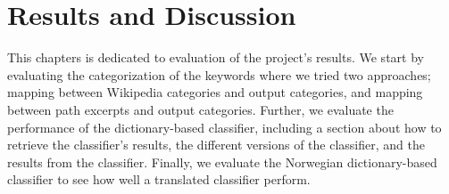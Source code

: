 \chapter{Results and Discussion}
This chapters is dedicated to evaluation of the project's results. We start by evaluating the categorization of the keywords where we tried two approaches; mapping between Wikipedia categories and output categories, and mapping between path excerpts and output categories. Further, we evaluate the performance of the dictionary-based classifier, including a section about how to retrieve the classifier's results, the different versions of the classifier, and the results from the classifier. Finally, we evaluate the Norwegian dictionary-based classifier to see how well a translated classifier perform. 



%









